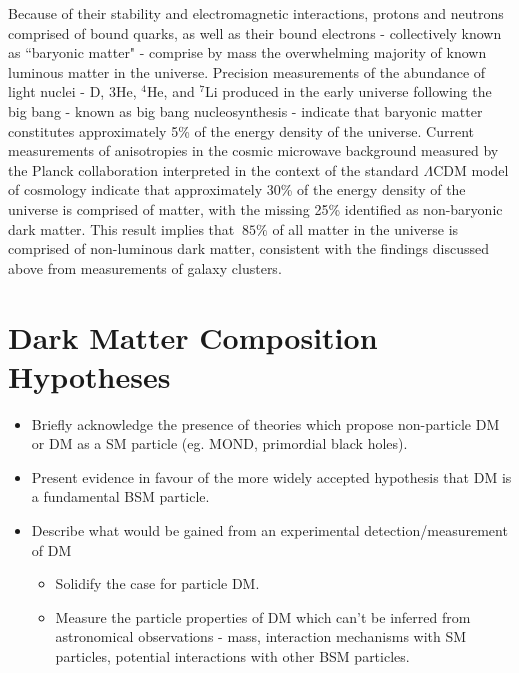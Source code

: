 Because of their stability and electromagnetic interactions, protons and neutrons comprised of bound quarks, as well as their bound electrons - collectively known as ``baryonic matter" - comprise by mass the overwhelming majority of known luminous matter in the universe. Precision measurements of the abundance of light nuclei - D, 3He, \(^4\)He, and \(^7\)Li  produced in the early universe following the big bang - known as big bang nucleosynthesis \cite{pdg_2018} - indicate that baryonic matter constitutes approximately 5\% \cite{pdg_2018} of the energy density of the universe. Current measurements of anisotropies in the cosmic microwave background \cite{cmb_1965} measured by the Planck collaboration \cite{Planck_2020} interpreted in the context of the standard \(\Lambda\)CDM model of cosmology \cite{pdg_2018} indicate that approximately 30\% of the energy density of the universe is comprised of matter, with the missing 25\% identified as non-baryonic dark matter. This result implies that \(~85\%\) of all matter in the universe is comprised of non-luminous dark matter, consistent with the findings discussed above from measurements of galaxy clusters.

\section{Dark Matter Composition Hypotheses}

\begin{itemize}
\item Briefly acknowledge the presence of theories which propose non-particle DM or DM as a SM particle (eg. MOND, primordial black holes).
\item Present evidence in favour of the more widely accepted hypothesis that DM is a fundamental BSM particle.
\item Describe what would be gained from an experimental detection/measurement of DM
\begin{itemize}
\item Solidify the case for particle DM.
\item Measure the particle properties of DM which can't be inferred from astronomical observations - mass, interaction mechanisms with SM particles, potential interactions with other BSM particles.
\end{itemize}
\end{itemize}

